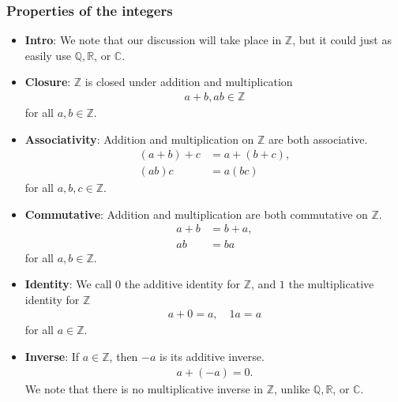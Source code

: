 \documentclass{report}
\begin{document}
    \subsubsection{Properties of the integers}
    \begin{itemize}
        \item \textbf{Intro}: We note that our discussion will take place in $\mathbb{Z}$, but it could just as easily use $\mathbb{Q}, \mathbb{R}$, or $\mathbb{C}$.
        \item \textbf{Closure}: $\mathbb{Z}$ is closed under addition and multiplication
            \begin{align*}
                a+b,ab \in \mathbb{Z} 
            \end{align*}
            for all $a,b \in \mathbb{Z}$.
        \item \textbf{Associativity}: Addition and multiplication on $\mathbb{Z}$ are both associative.
            \begin{align*}
                (a+b) + c &= a + (b+c), \\
                (ab)c &= a(bc)
            \end{align*}
            for all $a,b,c \in \mathbb{Z}$.
        \item \textbf{Commutative}: Addition and multiplication are both commutative on $\mathbb{Z}$.
            \begin{align*}
                a + b &= b + a, \\
                ab &= ba
            \end{align*}
            for all $a,b \in \mathbb{Z}$.
        \item \textbf{Identity}: We call 0 the additive identity for $ \mathbb{Z}$, and $1$ the multiplicative identity for $\mathbb{Z}$
            \begin{align*}
                a + 0 = a, \quad 1a = a
            \end{align*}
            for all $a \in \mathbb{Z}$.
        \item \textbf{Inverse}: If $a \in \mathbb{Z}$, then $-a$ is its additive inverse.
            \begin{align*}
                a + (-a) = 0
            .\end{align*}
            We note that there is no multiplicative inverse in $ \mathbb{Z}$, unlike $ \mathbb{Q}, \mathbb{R}$, or $ \mathbb{C}$.
    \end{itemize}

    \pagebreak 
\end{document}
